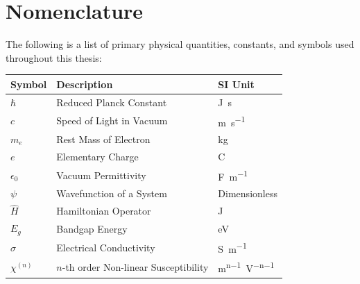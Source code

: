 
\chapter*{Nomenclature}

\noindent
The following is a list of primary physical quantities, constants, and symbols used throughout this thesis:

\vspace{0.2in}

\begin{table}[htbp]
    \centering
    \begin{tabular}{p{} p{} p{}}
        \toprule
        \textbf{Symbol} & \textbf{Description} & \textbf{SI Unit} \\
        \midrule
        $\hbar$ & Reduced Planck Constant & \si{\joule\second} \\
        $c$ & Speed of Light in Vacuum & \si{\meter\per\second} \\
        $m_e$ & Rest Mass of Electron & \si{\kilogram} \\
        $e$ & Elementary Charge & \si{\coulomb} \\
        $\epsilon_0$ & Vacuum Permittivity & \si{\farad\per\meter} \\
        $\psi$ & Wavefunction of a System & Dimensionless \\
        $\hat{H}$ & Hamiltonian Operator & \si{\joule} \\
        $E_g$ & Bandgap Energy & \si{\electronvolt} \\
        $\sigma$ & Electrical Conductivity & \si{\siemens\per\meter} \\
        $\chi^{(n)}$ & $n$-th order Non-linear Susceptibility & \si{\meter^{n-1}\per\volt^{n-1}} \\
        \bottomrule
    \end{tabular}
\end{table}
